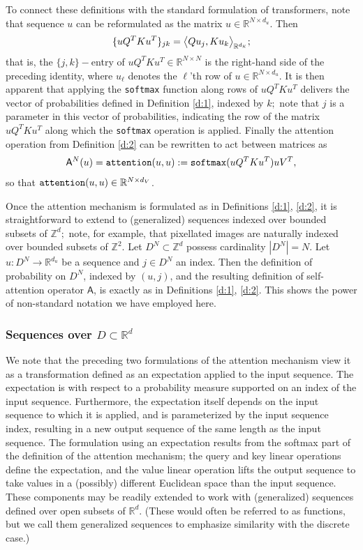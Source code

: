 \documentclass[twoside]{article}
\newcommand{\1}{\mathbbm{1}}
\newcommand{\R}{\mathbbm{R}}
\newcommand{\Z}{\mathbbm{Z}}
\newcommand{\sA}{\mathsf{A}}
\newcommand{\dK}{d_\textrm{\scalebox{.7}{$K$}}}
\providecommand{\mathbbm}{\mathbb} %
\begin{document}
To connect these definitions with the standard formulation of transformers, 
note that sequence $u$ can be reformulated as the matrix $u \in \R^{N \times d_u}.$ Then
\[
\{uQ^TKu^T\}_{jk}=\big\langle Q u_j, K u_k \big\rangle_{\R^{\dK}};
\]
that is, the $\{j,k\}-$entry of $uQ^TKu^T \in \R^{N \times N}$ is the right-hand side of the preceding identity, where $u_\ell$ denotes the $\ell$'th row of $u\in\R^{N\times d_u}$.
It is then apparent that applying the {\tt softmax} function along rows of $uQ^TKu^T$ delivers the vector
of probabilities defined in Definition \ref{d:1}, indexed by $k;$ note that $j$ is a parameter in this vector
of probabilities, indicating the row of the matrix $uQ^TKu^T$ along which the {\tt softmax} operation is applied.
Finally the
attention operation from Definition \ref{d:2} can be rewritten to act between matrices as
\[ {\sA^N(u)} = {\tt attention}(u,u):= {\tt softmax}(uQ^TKu^T)uV^T,\]
so that ${\tt attention}(u,u)\in\R^{N \times d_V}$.

\begin{remark}[Sequences over $D^N \subset \Z^d$]
\label{remark:self-attention_discrete_multidim}

Once the attention mechanism is formulated as in Definitions \ref{d:1}, \ref{d:2}, it is straightforward 
to extend to (generalized) sequences indexed over bounded subsets of $\Z^{d};$ note, for example, that pixellated
images are naturally indexed over bounded subsets of $\Z^2.$
Let $D^N \subset \Z^{d}$ possess cardinality $|D^N|=N.$ Let $u: D^N \to \R^{d_u}$ be a sequence and $j \in D^N$ an index.
Then the definition of probability on $D^N$, indexed by $(u,j)$, and the resulting definition of
self-attention operator $\sA$, is exactly as in Definitions \ref{d:1}, \ref{d:2}. This shows the power
of non-standard notation we have employed here.
\end{remark}

\subsubsection{Sequences over \texorpdfstring{$D \subset \R^d$}{}}
\label{subsubsec:self-attention_cont}


We note that the preceding two formulations of the attention mechanism view it as a transformation defined
as an expectation applied to the input sequence. The expectation is with respect to a probability
measure supported on an index of the input sequence. Furthermore, the expectation itself depends on the
input sequence to which it is applied, and is parameterized by the input sequence index, resulting in a new 
output sequence of the same length as the input sequence. The formulation using an expectation results from
the softmax part of the definition of the attention mechanism; the query and key linear operations
define the expectation, and the value linear operation lifts the output sequence to take values in a 
(possibly) different Euclidean space than the input sequence. 
These components may be readily extended to work with (generalized) sequences 
defined over open subsets of $\R^d$. (These would often be referred to as functions, but we call them
generalized sequences to emphasize similarity with the discrete case.)
\end{document}
